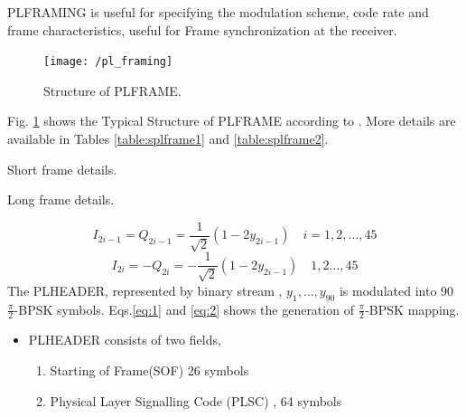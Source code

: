 \documentclass[journal,12pt,twocolumn]{IEEEtran}
\begin{document}
PLFRAMING is useful for  specifying the modulation scheme,  code rate and frame characteristics, useful for Frame synchronization at the receiver.



\begin{figure}[!ht]
\begin{center}
\texttt{[image: /pl\_framing]}
\end{center}
\caption{Structure of PLFRAME.}
\label{fig:splframe}
\end{figure}
%
 Fig. \ref{fig:splframe} shows the Typical Structure of PLFRAME according to \cite{dvb}.
More details are available in Tables \ref{table:splframe1} and \ref{table:splframe2}.

\begin{table}[!ht]
\begin{center}
{\tiny

}
\end{center}
\caption{Short frame details.}
\label{table:splframe1}
\end{table}
%
\begin{table}[!ht]
\begin{center}
{\tiny

}
\end{center}
\caption{Long frame details.}
\label{table:splframe2}
\end{table}

 \begin{equation}\label{eq:1}
I_{2i-1}=Q_{2i-1}=\frac{1}{\sqrt{2}}(1-2y_{2i-1}) \quad i=1,2,\dots,45
\end{equation}
\begin{equation}\label{eq:2}
I_{2i}=-Q_{2i}=-\frac{1}{\sqrt{2}}(1-2y_{2i-1}) \quad 1,2\dots,45
\end{equation}
The PLHEADER, represented by binary stream , $y_1,\dots,y_{90}$ is modulated into 90 $\frac{\pi}{2}$-BPSK symbols. Eqs.\eqref{eq:1} and \eqref{eq:2} shows the generation of $\frac{\pi}{2}$-BPSK mapping.


\begin{itemize}
\item PLHEADER consists of two fields,
\begin{enumerate}
\item Starting of Frame(SOF) 26 symbols
\item Physical Layer Signalling Code (PLSC) , 64 symbols
\end{enumerate}
\end{itemize} 
\end{document}
